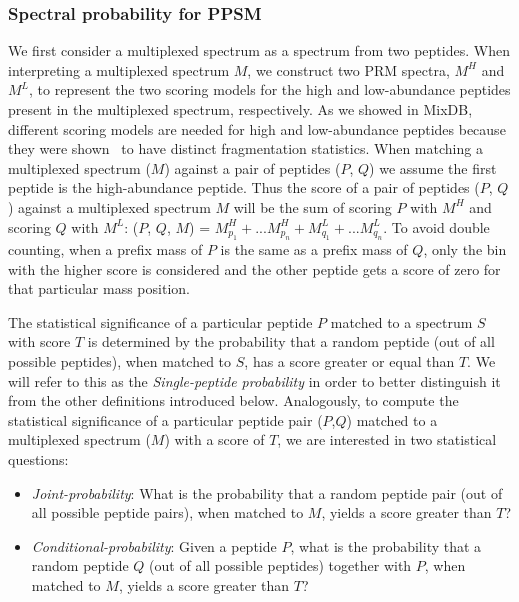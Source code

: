\documentclass[arial,11pt]{article}
\begin{document}
\subsubsection{Spectral probability for PPSM}

We first consider a multiplexed spectrum as a spectrum from two peptides. When interpreting a multiplexed spectrum $M$, we construct two PRM spectra, $M^{H}$ and $M^{L}$, to represent the two scoring models for the high and low-abundance peptides present in the multiplexed spectrum, respectively.  As we showed in MixDB, different scoring models are needed for high and low-abundance peptides because they were shown~\cite{wang2011peptide} to have distinct fragmentation statistics.  When matching a multiplexed spectrum ($M$) against a pair of peptides ($P$, $Q$) we assume the first peptide is the high-abundance peptide.  Thus the score of a pair of peptides ($P$, $Q$) against a multiplexed spectrum $M$ will be the sum of scoring $P$ with $M^{H}$ and scoring $Q$ with $M^{L}$: ($P$, $Q$, $M$) = $M^{H}_{p_{1}} + ... M^{H}_{p_{n}} + M^{L}_{q_{1}} + ... M^{L}_{q_{n}}$. To avoid double counting, when a prefix mass of $P$ is the same as a prefix mass of $Q$, only the bin with the higher score is considered and the other peptide gets a score of zero for that particular mass position.

The statistical significance of a particular peptide $P$ matched to a spectrum $S$ with score $T$ is determined by the probability that a random peptide (out of all possible peptides), when matched to $S$, has a score greater or equal than $T$. We will refer to this as the \emph{Single-peptide probability} in order to better distinguish it from the other definitions introduced below.   Analogously, to compute the statistical significance of a particular peptide pair ($P$,$Q$) matched to a multiplexed spectrum ($M$) with a score of $T$, we are interested in two statistical questions:

\begin{itemize}
\item \emph{Joint-probability}: What is the probability that a random peptide pair (out of all possible peptide pairs), when matched to $M$, yields a score greater than  $T$?

\item \emph{Conditional-probability}: Given a peptide $P$, what is the probability that a random peptide $Q$ (out of all possible peptides) together with $P$, when matched to $M$, yields a score greater than  $T$?
\end{itemize}
\end{document}
